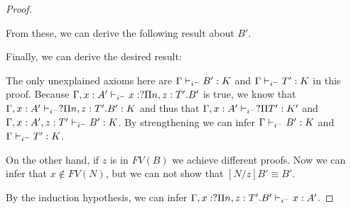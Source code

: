 \begin{proof}
\begin{prooftree}
\end{prooftree}

\begin{prooftree}
\end{prooftree}

From these, we can derive the following result about $B'$.

\begin{prooftree}



\end{prooftree}

Finally, we can derive the desired result:

\begin{prooftree}



\end{prooftree}

The only unexplained axioms here are 
$\Gamma \judgeCI B': K$ and $\Gamma \judgeCI T' : K$ in this proof.
Because $\Gamma, x : A' \judgeCI x : ?\Pi n,z:T' . B'$ is true, we know that 
$\Gamma, x : A' \judgeCI ?\Pi n,z : T' . B' : K$ and thus that 
$\Gamma,x : A' \judgeCI ?\Pi T' : K' $ and $\Gamma, x : A', z : T' \judgeCI B' : K$.  
By strengthening we can infer $\Gamma \judgeCI B': K$ and $\Gamma \judgeCI T' : K$.


On the other hand, if $z$ is in $FV(B)$ we achieve different proofs.  
Now we can infer that $x \notin FV(N)$, but we can not show that $[N/z]B' \equiv B'$.

By the induction hypothesis, we can infer $\Gamma , x : ?\Pi n,z : T' . B'\judgeCI x : A'$.


\end{proof}
